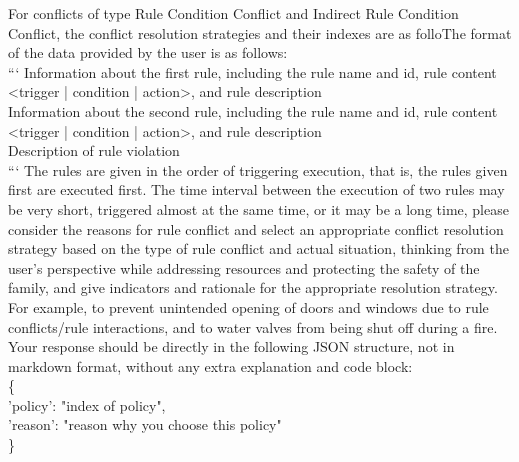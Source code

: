 {	For conflicts of type Rule Condition Conflict and Indirect Rule Condition Conflict, the conflict resolution strategies and their indexes are as folloThe format of the data provided by the user is as follows:\\
	```
	Information about the first rule, including the rule name and id, rule content <trigger | condition | action>, and rule description\\
	Information about the second rule, including the rule name and id, rule content <trigger | condition | action>, and rule description\\
	Description of rule violation\\
	```
	The rules are given in the order of triggering execution, that is, the rules given first are executed first. The time interval between the execution of two rules may be very short, triggered almost at the same time, or it may be a long time, please consider the reasons for rule conflict and select an appropriate conflict resolution strategy based on the type of rule conflict and actual situation, thinking from the user's perspective while addressing resources and protecting the safety of the family, and give indicators and rationale for the appropriate resolution strategy.
	For example, to prevent unintended opening of doors and windows due to rule conflicts/rule interactions, and to water valves from being shut off during a fire.\\
	Your response should be directly in the following JSON structure, not in markdown format, without any extra explanation and code block:\\
	\{\\
	'policy': "index of policy",\\
	'reason': "reason why you choose this policy"\\
	\}
}